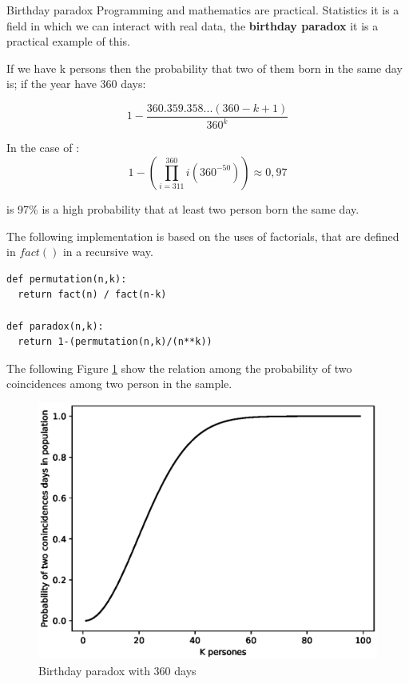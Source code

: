 \documentclass{beamer}
\begin{document}
\begin{frame}{Birthday paradox}
Programming and mathematics are practical.  Statistics it is a field in which we can interact with real data, the \textbf{birthday paradox} it is a practical example of this.

If we have k persons then the probability that two of them born in the same day is; if the year have 360 days:

$$1- \frac{360.359.358...(360-k+1)}{360^{k}}$$

In the case of :
\begin{equation}\label{paradox}
 1 - \left( \prod_{i=311}^{360} i (360^{-50})\right)\approx 0,97 
 \end{equation}


is 97\%  is a high probability  that at least two person born the same day.
\end{frame}



\begin{frame}[fragile]
The following implementation is based on the uses of factorials, that are defined in $fact()$ in a recursive way.

\begin{lstlisting}
def permutation(n,k):
  return fact(n) / fact(n-k)

def paradox(n,k):
  return 1-(permutation(n,k)/(n**k))
\end{lstlisting}

\end{frame}



\begin{frame}
The following Figure \ref{fig} show the relation among the probability of two coincidences among two person in the sample.
\begin{figure}[htbp]
\centerline{\includegraphics[scale=0.55]{paradox.eps}}
\caption{Birthday paradox with 360 days}
\label{fig}
\end{figure}
\end{frame}
\end{document}
